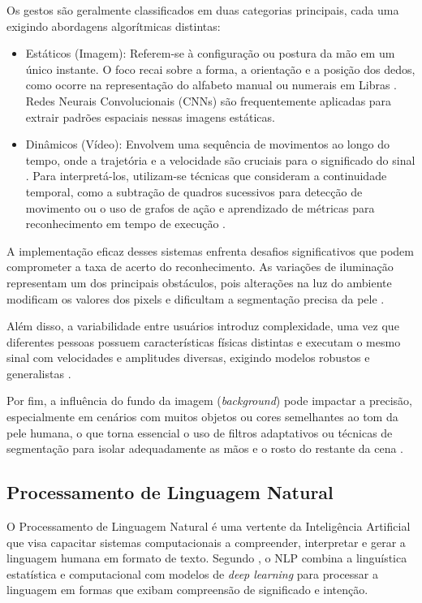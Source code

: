 \documentclass[
    12pt,                %
    openright,           %
    oneside,             %
    a4paper,             %
    english,             %
    brazil               %
]{abntex2}
\begin{document}
Os gestos são geralmente classificados em duas categorias principais, cada uma exigindo abordagens algorítmicas distintas:
\begin{itemize}
    \item Estáticos (Imagem): Referem-se à configuração ou postura da mão em um único instante. O foco recai sobre a forma, a orientação e a posição dos dedos, como ocorre na representação do alfabeto manual ou numerais em Libras \cite{PintoJunior2019}. Redes Neurais Convolucionais (CNNs) são frequentemente aplicadas para extrair padrões espaciais nessas imagens estáticas.
    \item Dinâmicos (Vídeo): Envolvem uma sequência de movimentos ao longo do tempo, onde a trajetória e a velocidade são cruciais para o significado do sinal \cite{Silva2017}. Para interpretá-los, utilizam-se técnicas que consideram a continuidade temporal, como a subtração de quadros sucessivos para detecção de movimento ou o uso de grafos de ação e aprendizado de métricas para reconhecimento em tempo de execução \cite{Monteiro2016}.
\end{itemize}

A implementação eficaz desses sistemas enfrenta desafios significativos que podem comprometer a taxa de acerto do reconhecimento. As variações de iluminação representam um dos principais obstáculos, pois alterações na luz do ambiente modificam os valores dos pixels e dificultam a segmentação precisa da pele \cite{Bittencourt2002}. 

Além disso, a variabilidade entre usuários introduz complexidade, uma vez que diferentes pessoas possuem características físicas distintas e executam o mesmo sinal com velocidades e amplitudes diversas, exigindo modelos robustos e generalistas \cite{Silva2017}. 

Por fim, a influência do fundo da imagem (\textit{background}) pode impactar a precisão, especialmente em cenários com muitos objetos ou cores semelhantes ao tom da pele humana, o que torna essencial o uso de filtros adaptativos ou técnicas de segmentação para isolar adequadamente as mãos e o rosto do restante da cena \cite{Monteiro2016}.

\subsection{Processamento de Linguagem Natural}

O Processamento de Linguagem Natural é uma vertente da Inteligência Artificial que visa capacitar sistemas computacionais a compreender, interpretar e gerar a linguagem humana em formato de texto. Segundo , o NLP combina a linguística estatística e computacional com modelos de \textit{deep learning} para processar a linguagem em formas que exibam compreensão de significado e intenção.
\end{document}
